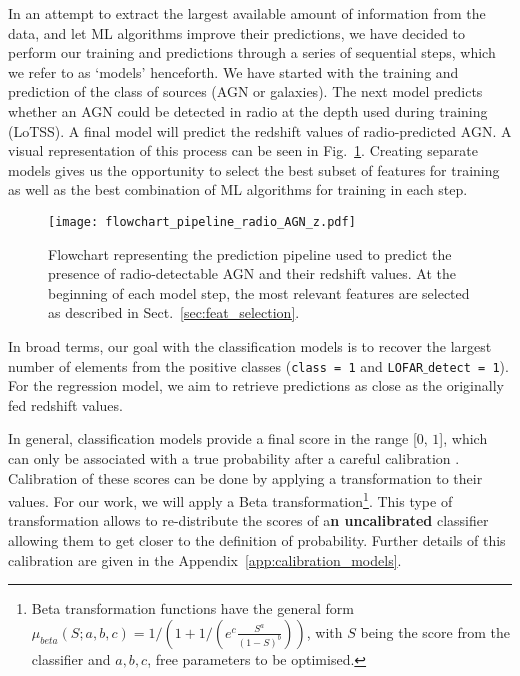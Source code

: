 \documentclass{aa}
\begin{document}
In an attempt to extract the largest available amount of information from the data, and let ML algorithms improve their predictions, we have decided to perform our training and predictions through a series of sequential steps, which we refer to as `models' henceforth. We have started with the training and prediction of the class of sources (AGN or galaxies). The next model predicts whether an AGN could be detected in radio at the depth used during training (LoTSS). A final model will predict the redshift values of radio-predicted AGN. A visual representation of this process can be seen in Fig.~\ref{fig:pipeline_flowchart}. Creating separate models gives us the opportunity to select the best subset of features for training as well as the best combination of ML algorithms for training in each step.

\begin{figure}
   \centering
   \texttt{[image: flowchart\_pipeline\_radio\_AGN\_z.pdf]}
   \caption{Flowchart representing the prediction pipeline used to predict the presence of radio-detectable AGN and their redshift values. At the beginning of each model step, the most relevant features are selected as described in Sect.~\ref{sec:feat_selection}.}
   \label{fig:pipeline_flowchart}
\end{figure}

In broad terms, our goal with the classification models is to recover the largest number of elements from the positive classes (\texttt{class = 1} and \texttt{LOFAR$\_$detect = 1}). For the regression model, we aim to retrieve predictions as close as the originally fed redshift values.

In general, classification models provide a final score in the range [$0$, $1$], which can only be associated with a true probability after a careful calibration  \citep{10.1214/17-EJS1338SI, pmlr-v54-kull17a}. Calibration of these scores can be done by applying a transformation to their values. For our work, we will apply a Beta transformation\footnote{Beta transformation functions have the general form $\mu_{beta}(S;a,b,c) = 1/\left(1 + 1 / \left(e^{c} \frac{S^{a}}{(1 - S)^{b}}\right)\right)$, with $S$ being the score from the classifier and $a,b,c$, free parameters to be optimised.}. This type of transformation allows to re-distribute the scores of a\textbf{n uncalibrated} classifier allowing them to get closer to the definition of probability. Further details of this calibration are given in the Appendix~\ref{app:calibration_models}.
\end{document}
